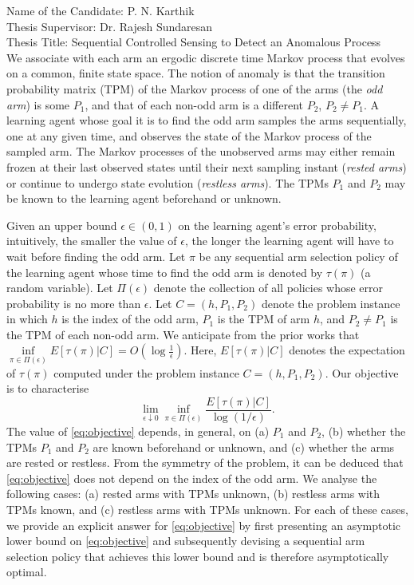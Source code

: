 \documentclass[11pt]{letter} %
\begin{document}
\begin{letter}{Name of the Candidate: P. N. Karthik\\
Thesis Supervisor: Dr. Rajesh Sundaresan\\
Thesis Title: Sequential Controlled Sensing to Detect an Anomalous Process\\
}
We associate with each arm an ergodic discrete time Markov process that evolves on a common, finite state space. The notion of anomaly is that the transition probability matrix (TPM) of the Markov process of one of the arms (the {\em odd arm}) is some $P_{1}$, and that of each non-odd arm is a different $P_{2}$, $P_{2}\neq P_{1}$. A learning agent whose goal it is to find the odd arm samples the arms sequentially, one at any given time, and observes the state of the Markov process of the sampled arm. The Markov processes of the unobserved arms may either remain frozen at their last observed states until their next sampling instant ({\em rested arms}) or continue to undergo state evolution ({\em restless arms}). The TPMs $P_{1}$ and $P_{2}$ may be known to the learning agent beforehand or unknown. 

Given an upper bound $\epsilon\in (0, 1)$ on the learning agent's error probability, intuitively, the smaller the value of $\epsilon$, the longer the learning agent will have to wait before finding the odd arm. Let $\pi$ be any sequential arm selection policy of the learning agent whose time to find the odd arm is denoted by $\tau(\pi)$ (a random variable). Let $\Pi(\epsilon)$ denote the collection of all policies whose error probability is no more than $\epsilon$. Let $C=(h, P_1, P_2)$ denote the problem instance in which $h$ is the index of the odd arm, $P_1$ is the TPM of arm $h$, and $P_2\neq P_1$ is the TPM of each non-odd arm. We anticipate from the prior works that $\inf\limits_{\pi\in \Pi(\epsilon)} E[\tau(\pi)|C] = O\left(\log \frac{1}{\epsilon}\right)$. Here, $E[\tau(\pi)|C]$ denotes the expectation of $\tau(\pi)$ computed under the problem instance $C=(h, P_1, P_2)$. Our objective is to characterise
\begin{equation}
	\lim\limits_{\epsilon\downarrow 0}  \inf\limits_{\pi\in \Pi(\epsilon)} \frac{E[\tau(\pi)|C]}{\log (1/\epsilon)}.
	\label{eq:objective}
\end{equation}
The value of \eqref{eq:objective} depends, in general, on (a) $P_1$ and $P_2$, (b) whether the TPMs $P_1$ and $P_2$ are known beforehand or unknown, and (c) whether the arms are rested or restless. From the symmetry of the problem, it can be deduced that \eqref{eq:objective} does not depend on the index of the odd arm. We analyse the following cases: (a) rested arms with TPMs unknown, (b) restless arms with TPMs known, and (c) restless arms with TPMs unknown. For each of these cases, we provide an explicit answer for \eqref{eq:objective} by first presenting an asymptotic lower bound on \eqref{eq:objective} and subsequently devising a sequential arm selection policy  that achieves this lower bound and is therefore asymptotically optimal. 


\end{letter}
\end{document}
